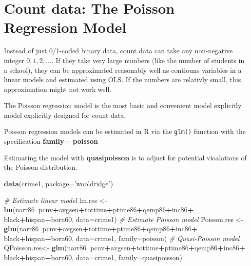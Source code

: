 \documentclass[]{book}
\newenvironment{Shaded}{\begin{snugshade}}{\end{snugshade}}
\newcommand{\CommentTok}[1]{\textcolor[rgb]{0.56,0.35,0.01}{\textit{#1}}}
\newcommand{\DataTypeTok}[1]{\textcolor[rgb]{0.13,0.29,0.53}{#1}}
\newcommand{\KeywordTok}[1]{\textcolor[rgb]{0.13,0.29,0.53}{\textbf{#1}}}
\newcommand{\NormalTok}[1]{#1}
\newcommand{\OperatorTok}[1]{\textcolor[rgb]{0.81,0.36,0.00}{\textbf{#1}}}
\newcommand{\StringTok}[1]{\textcolor[rgb]{0.31,0.60,0.02}{#1}}
\begin{document}
\hypertarget{count-data-the-poisson-regression-model}{%
\section{Count data: The Poisson Regression Model}\label{count-data-the-poisson-regression-model}}

Instead of just 0/1-coded binary data, count data can take any non-negative integer \(0, 1, 2, \dots\). If they take very large numbers (like the number of students in a school), they can be approximated reasonably well as contiouns variables in a linear models and estimated using OLS. If the numbers are relativly small, this approximation might not work well.

The Poisson regression model is the most basic and convenient model explicitly model explicitly designed for count data.

Poisson regression models can be estimated in R via the \texttt{glm()} function with the specification \textbf{family= poisson}

Estimating the model with \textbf{quasipoisson} is to adjust for potential vioalations of the Poisson distribution.

\begin{Shaded}
\begin{Highlighting}[]
\KeywordTok{data}\NormalTok{(crime1, }\DataTypeTok{package=}\StringTok{'wooldridge'}\NormalTok{)}

\CommentTok{# Estimate linear model}
\NormalTok{lm.res      <-}\StringTok{  }\KeywordTok{lm}\NormalTok{(narr86}\OperatorTok{~}\NormalTok{pcnv}\OperatorTok{+}\NormalTok{avgsen}\OperatorTok{+}\NormalTok{tottime}\OperatorTok{+}\NormalTok{ptime86}\OperatorTok{+}\NormalTok{qemp86}\OperatorTok{+}\NormalTok{inc86}\OperatorTok{+}
\StringTok{                     }\NormalTok{black}\OperatorTok{+}\NormalTok{hispan}\OperatorTok{+}\NormalTok{born60, }\DataTypeTok{data=}\NormalTok{crime1)}
\CommentTok{# Estimate Poisson model}
\NormalTok{Poisson.res <-}\StringTok{ }\KeywordTok{glm}\NormalTok{(narr86}\OperatorTok{~}\NormalTok{pcnv}\OperatorTok{+}\NormalTok{avgsen}\OperatorTok{+}\NormalTok{tottime}\OperatorTok{+}\NormalTok{ptime86}\OperatorTok{+}\NormalTok{qemp86}\OperatorTok{+}\NormalTok{inc86}\OperatorTok{+}
\StringTok{                     }\NormalTok{black}\OperatorTok{+}\NormalTok{hispan}\OperatorTok{+}\NormalTok{born60, }\DataTypeTok{data=}\NormalTok{crime1, }\DataTypeTok{family=}\NormalTok{poisson)}
\CommentTok{# Quasi-Poisson model}
\NormalTok{QPoisson.res<-}\StringTok{ }\KeywordTok{glm}\NormalTok{(narr86}\OperatorTok{~}\NormalTok{pcnv}\OperatorTok{+}\NormalTok{avgsen}\OperatorTok{+}\NormalTok{tottime}\OperatorTok{+}\NormalTok{ptime86}\OperatorTok{+}\NormalTok{qemp86}\OperatorTok{+}\NormalTok{inc86}\OperatorTok{+}
\StringTok{                     }\NormalTok{black}\OperatorTok{+}\NormalTok{hispan}\OperatorTok{+}\NormalTok{born60, }\DataTypeTok{data=}\NormalTok{crime1, }\DataTypeTok{family=}\NormalTok{quasipoisson)}
\end{Highlighting}
\end{Shaded}
\end{document}
